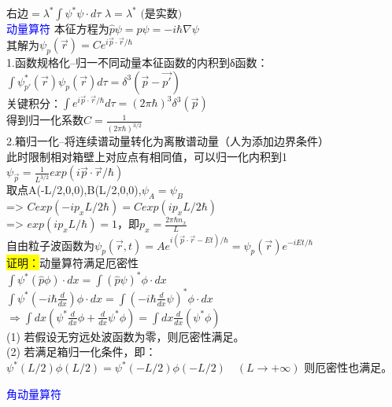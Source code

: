 \documentclass[a4paper,8pt]{extarticle} %
\newcommand{\bluetext}[1]{\textcolor{blue}{#1}}
\newcommand{\yellowback}[1]{\colorbox{yellow}{#1}}
\begin{document}
\begin{multicols}{3}
$\text{右边} = \lambda^*\int \psi^*\psi\cdot d\tau$
$\lambda = \lambda^* \text{ (是实数)}$\\
\bluetext{动量算符}
本征方程为$\hat{p}\psi = p\psi=-i\hbar\nabla\psi$\\
其解为$\psi_p(\vec{r}) = Ce^{i\vec{p}\cdot\vec{r}/\hbar}$\\
1.函数规格化--归一不同动量本征函数的内积到δ函数：\\
$\int\psi^*_{p'}(\vec{r})\psi_{p}(\vec{r})d\tau = \delta^3(\vec{p}-\vec{p'})$\\
关键积分：$\int e^{i\vec{p}\cdot\vec{r}/\hbar}d\tau = (2\pi\hbar)^3\delta^3(\vec{p})$\\
得到归一化系数$C = \frac{1}{(2\pi\hbar)^{3/2}}$\\
2.箱归一化--将连续谱动量转化为离散谱动量（人为添加边界条件）\\
此时限制相对箱壁上对应点有相同值，可以归一化内积到1\\
$\psi_{\vec{p}}=\frac{1}{L^{3/2}}exp(i\vec{p}\cdot\vec{r}/\hbar)$\\
取点A(-L/2,0,0),B(L/2,0,0),$\psi_A=\psi_B$\\
=> $Cexp(-ip_xL/2\hbar)=Cexp(ip_xL/2\hbar)$\\
=> $exp(ip_xL/\hbar)=1$，即$p_x=\frac{2\pi\hbar n_x}{L}$\\
自由粒子波函数为$\psi_p(\vec{r},t)=Ae^{i(\vec{p}\cdot\vec{r}-Et)/\hbar}=\psi_p(\vec{r})e^{-iEt/\hbar}$\\
\yellowback{证明：}动量算符满足厄密性\\
$\int \psi^*(\hat{p}\phi)\cdot dx = \int(\hat{p}\psi)^*\phi\cdot dx$\\
$\int \psi^*(-i\hbar\frac{d}{dx})\phi\cdot dx = \int(-i\hbar\frac{d}{dx}\psi)^*\phi\cdot dx$\\
$\Rightarrow \int dx(\psi^*\frac{d}{dx}\phi + \frac{d}{dx}\psi^*\phi) = \int dx\frac{d}{dx}(\psi^*\phi)$\\
(1) 若假设无穷远处波函数为零，则厄密性满足。\\
(2) 若满足箱归一化条件，即：\\
$\psi^*(L/2)\phi(L/2) = \psi^*(-L/2)\phi(-L/2) \quad (L \rightarrow +\infty)$
则厄密性也满足。

\bluetext{角动量算符}


\end{multicols}
\end{document}
